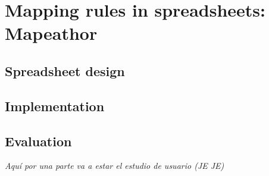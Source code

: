 \section{Mapping rules in spreadsheets: Mapeathor}
\label{sec:chp5_mapeathor}

\subsection{Spreadsheet design}

\subsection{Implementation}

\subsection{Evaluation}

\textit{Aquí por una parte va a estar el estudio de usuario (JE JE)}